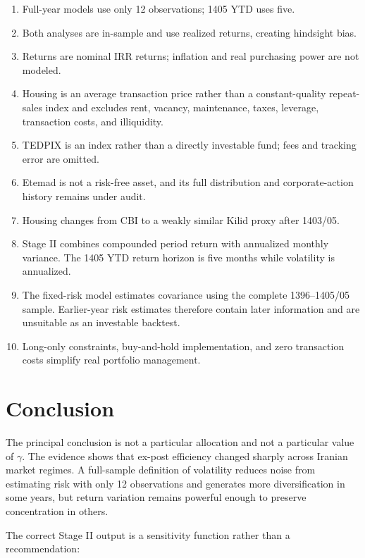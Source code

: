 \documentclass[11pt,a4paper]{article}
\begin{document}
\begin{enumerate}
  \item Full-year models use only 12 observations; 1405 YTD uses five.
  \item Both analyses are in-sample and use realized returns, creating hindsight bias.
  \item Returns are nominal IRR returns; inflation and real purchasing power are not modeled.
  \item Housing is an average transaction price rather than a constant-quality repeat-sales
  index and excludes rent, vacancy, maintenance, taxes, leverage, transaction costs, and
  illiquidity.
  \item TEDPIX is an index rather than a directly investable fund; fees and tracking error are
  omitted.
  \item Etemad is not a risk-free asset, and its full distribution and corporate-action history
  remains under audit.
  \item Housing changes from CBI to a weakly similar Kilid proxy after 1403/05.
  \item Stage II combines compounded period return with annualized monthly variance. The 1405
  YTD return horizon is five months while volatility is annualized.
  \item The fixed-risk model estimates covariance using the complete 1396--1405/05 sample.
  Earlier-year risk estimates therefore contain later information and are unsuitable as an
  investable backtest.
  \item Long-only constraints, buy-and-hold implementation, and zero transaction costs simplify
  real portfolio management.
\end{enumerate}

\section{Conclusion}

The principal conclusion is not a particular allocation and not a particular value of
$\gamma$. The evidence shows that ex-post efficiency changed sharply across Iranian market
regimes. A full-sample definition of volatility reduces noise from estimating risk with only
12 observations and generates more diversification in some years, but return variation remains
powerful enough to preserve concentration in others.

The correct Stage II output is a sensitivity function rather than a recommendation:
\end{document}
